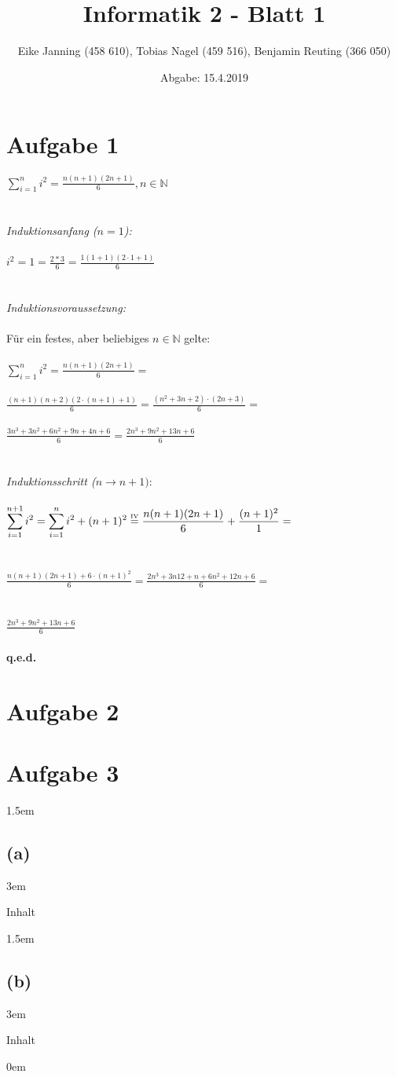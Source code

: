 \documentclass[11pt]{article}
\title{Informatik 2 - Blatt 1}
\author{Eike Janning (458 610), Tobias Nagel (459 516), Benjamin Reuting (366 050)}
\date{Abgabe: 15.4.2019}
\begin{document}
\maketitle

\section*{Aufgabe 1}

$\displaystyle\sum_{i=1}^{n} i^2 = \frac{n(n+1)(2n+1)}{6}, n\in\mathbb{N}$
\\\\\\
\textit{Induktionsanfang ($n=1$):}\\\\
$i^2 = 1 = \frac{2*3}{6} = \frac{1(1+1)(2\cdot1+1)}{6}$
\\\\\\
\textit{Induktionsvoraussetzung:}\\\\
Für ein festes, aber beliebiges $n\in\mathbb{N}$ gelte:\\\\
$\displaystyle\sum_{i=1}^{n} i^2 = \frac{n(n+1)(2n+1)}{6} = $\\\\
$\displaystyle\frac{(n+1)(n+2)(2 \cdot (n+1)+1)}{6} = \frac{(n^2+3n+2) \cdot (2n+3)}{6} = $\\\\
$\displaystyle\frac{3n^3+3n^2+6n^2+9n+4n+6}{6} = \frac{2n^3+9n^2+13n+6}{6}$
\\\\\\
\textit{Induktionsschritt ($n \to n+1):$}\\\\
$\displaystyle\sum_{i=1}^{n+1} i^2 = \displaystyle\sum_{i=1}^{n} i^2 + (n+1)^2 \overset{\text{\tiny{IV}}}{=} \frac{n(n+1)(2n+1)}{6} + \frac{(n+1)^2}{1} = $\\\\\\
$\displaystyle\frac{n(n+1)(2n+1) + 6 \cdot (n+1)^2}{6} = \frac{2n^3+3n12+n+6n^2+12n+6}{6} = $\\\\\\
$\displaystyle\frac{2n^3+9n^2+13n+6}{6}$\\\\
\textbf{q.e.d.}

\pagebreak

\section*{Aufgabe 2}

\pagebreak

\section*{Aufgabe 3}

\leftskip 1.5em
\subsection*{(a)}
\leftskip 3em

Inhalt

\leftskip 1.5em
\subsection*{(b)}
\leftskip 3em

Inhalt

\leftskip 0em
\end{document}
